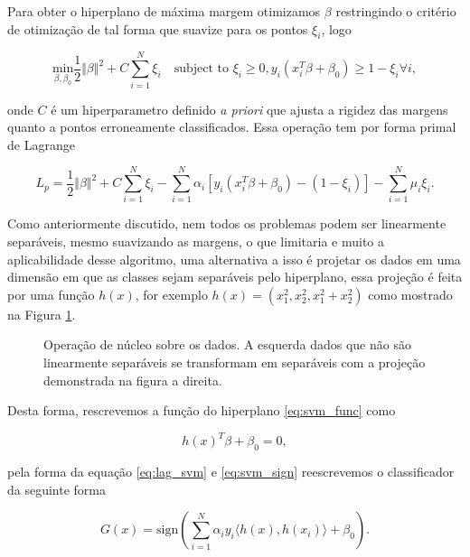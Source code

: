 Para obter o hiperplano de máxima margem otimizamos $\beta$ restringindo o
critério de otimização de tal forma que suavize para os pontos $\xi_i$, logo

\begin{equation}
    \underset{\beta,\beta_0}{\text{min}} \frac{1}{2}\Vert\beta\Vert^2 +
    C\sum_{i=1}^{N}\xi_i \hspace{1em} \text{subject to } \xi_i \geq 0,
    y_i(x_i^T\beta+\beta_0) \geq 1-\xi_i \forall i,
\end{equation}

onde $C$ é um hiperparametro definido \textit{a priori} que ajusta a rigidez
das margens quanto a pontos erroneamente classificados. Essa operação tem por
forma primal de Lagrange

\begin{equation}
    \label{eq:lag_svm}
    L_p = \frac{1}{2}\Vert\beta\Vert^2 + C\sum_{i=1}^{N}\xi_i -
    \sum_{i=1}^{N}\alpha_i [y_i(x_i^T\beta+\beta_0) - (1-\xi_i)] -
    \sum_{i=1}^{N}\mu_i\xi_i.
\end{equation}

Como anteriormente discutido, nem todos os problemas podem ser
linearmente separáveis, mesmo suavizando as margens, o que limitaria e muito a aplicabilidade desse
algoritmo, uma alternativa a isso é projetar os dados em uma dimensão em que as
classes sejam separáveis pelo hiperplano, essa projeção é feita por uma função
$h(x)$, for exemplo $h(x) = (x_1^2, x_2^2, x_1^2+x_2^2)$ como mostrado na
Figura \ref{fig:svm_kernel}.

\begin{figure}[ht]
   \centering
    \def\svgwidth{\linewidth}
    \caption{Operação de núcleo sobre os dados. A esquerda dados que não são
    linearmente separáveis se transformam em separáveis com a projeção
    demonstrada na figura a direita.}
    \label{fig:svm_kernel}
\end{figure}

Desta forma, rescrevemos a função do hiperplano \ref{eq:svm_func} como

 \begin{equation}
    \label{eq:svm_kernel}
    h(x)^T\beta + \beta_0 = 0,
\end{equation}

pela forma da equação \ref{eq:lag_svm} e \ref{eq:svm_sign} reescrevemos
o classificador da seguinte forma

\begin{equation}
    G(x) = \text{sign}
    \left(\sum_{i=1}^N \alpha_i y_i \langle h(x),h(x_i)\rangle+\beta_0 \right).
\end{equation}

